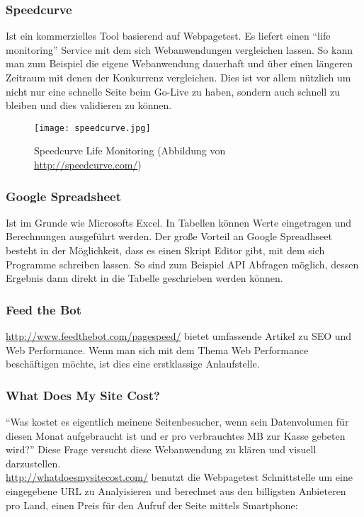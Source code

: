 

		\subsubsection{Speedcurve} %
		\label{ssub:speedcurve}
			Ist ein kommerzielles Tool basierend auf Webpagetest. Es liefert einen "`life monitoring"' Service mit dem sich Webanwendungen vergleichen lassen. So kann man zum Beispiel die eigene Webanwendung dauerhaft und über einen längeren Zeitraum mit denen der Konkurrenz vergleichen. Dies ist vor allem nützlich um nicht nur eine schnelle Seite beim Go-Live zu haben, sondern auch schnell zu bleiben und dies validieren zu können.

			\begin{figure}[htbp]
				\begin{center}
					\texttt{[image: speedcurve.jpg]}
					\caption{Speedcurve Life Monitoring (Abbildung von \url{http://speedcurve.com/})}
					\label{fig:speedcurve}
				\end{center}
			\end{figure}


		\subsubsection{Google Spreadsheet} %
		\label{ssub:google_spreadsheet}
			Ist im Grunde wie Microsofts Excel. In Tabellen können Werte eingetragen und Berechnungen ausgeführt werden.
			Der große Vorteil an Google Spreadhseet besteht in der Möglichkeit, dass es einen Skript Editor gibt, mit dem sich Programme schreiben lassen. So sind zum Beispiel API Abfragen möglich, dessen Ergebnis dann direkt in die Tabelle geschrieben werden können.		

		\subsubsection{Feed the Bot} %
		\label{ssub:feed_the_bot}
			\url{http://www.feedthebot.com/pagespeed/} bietet umfassende Artikel zu SEO und Web Performance. Wenn man sich mit dem Thema Web Performance beschäftigen möchte, ist dies eine erstklassige Anlaufstelle.


		\subsubsection{What Does My Site Cost?} %
		\label{ssub:what_does_my_site_cost}
			"`Was kostet es eigentlich meinene Seitenbesucher, wenn sein Datenvolumen für diesen Monat aufgebraucht ist und er pro verbrauchtes MB zur Kasse gebeten wird?"' Diese Frage versucht diese Webanwendung zu klären und visuell darzustellen.\\
			\url{http://whatdoesmysitecost.com/} benutzt die Webpagetest Schnittstelle um eine eingegebene URL zu Analyisieren und berechnet aus den billigsten Anbieteren pro Land, einen Preis für den Aufruf der Seite mittels Smartphone:

